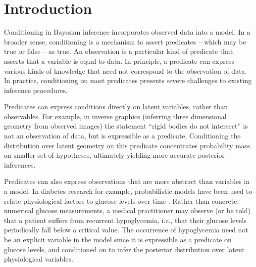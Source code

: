 
\section{Introduction}

Conditioning in Bayesian inference incorporates observed data into a model.
In a broader sense, conditioning is a mechanism to assert predicates -- which may be true or false -- as true.
An observation is a particular kind of predicate that asserts that a variable is equal to data.
In principle, a predicate can express various kinds of knowledge that need not correspond to the observation of data.
In practice, conditioning on most predicates presents severe challenges to existing inference procedures.


Predicates can express conditions directly on latent variables, rather than observables.
For example, in inverse graphics \cite{kulkarni2015deep} (inferring three dimensional geometry from observed images) the statement ``rigid bodies do not intersect'' is not an observation of data, but is expressible as a predicate.
Conditioning the distribution over latent geometry on this predicate concentrates probability mass on smaller set of hypotheses, ultimately yielding more accurate posterior inferences.

Predicates can also express observations that are more abstract than variables in a model.
In diabetes research for example, probabilistic models have been used to relate physiological factors to glucose levels over time \citep{levine2017offline,murata2004probabilistic}.
Rather than concrete, numerical glucose measurements, a medical practitioner may observe (or be told) that a patient suffers from recurrent hypoglycemia, i.e., that their glucose levels periodically fall below a critical value.
The occurrence of hypoglycemia need not be an explicit variable in the model since it is expressible as a predicate on glucose levels, and conditioned on to infer the posterior distribution over latent physiological variables.






